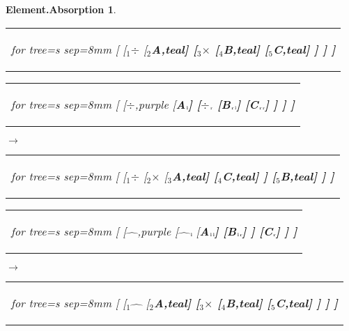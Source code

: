 \documentclass[UTF8,10pt]{ctexart}
\newcommand{\subtreeA}{\bf A}
\newcommand{\subtreeB}{\bf B}
\newcommand{\subtreeC}{\bf C}
\newcommand{\I}{$_{\scriptscriptstyle 1}$}
\newcommand{\II}{$_{\scriptscriptstyle 2}$}
\newcommand{\III}{$_{\scriptscriptstyle 3}$}
\newcommand{\IV}{$_{\scriptscriptstyle 4}$}
\newcommand{\V}{$_{\scriptscriptstyle 5}$}
\newcommand{\lc}{$_{\:\!\scriptscriptstyle\rm l\!}$}
\newcommand{\rc}{$_{\:\!\scriptscriptstyle\rm r\!}$}
\newcommand{\Multiplication}{$\times$}
\newcommand{\Division}{$\div$}
\newcommand{\Power}{$\hat{\quad}$}
\newtheorem*{Element.Absorption}{\bf Element.Absorption }
\begin{document}
\begin{center}
\begin{Element.Absorption}
\begin{tabular}{c}
				\begin{forest}
					for tree={s sep=8mm}
					[
						[\I\Division
							[\II\subtreeA,teal]
							[\III\Multiplication
								[\IV\subtreeB,teal]
								[\V\subtreeC,teal]
							]
						]
					]
				\end{forest}
			\end{tabular}
			\par\bigskip
			\begin{tabular}{c}
				\begin{forest}
					for tree={s sep=8mm}
					[
						[\Division,purple
							[\subtreeA\lc]
							[\Division\rc
								[\subtreeB\rc\lc]
								[\subtreeC\rc\rc]
							]
						]
					]
				\end{forest}
			\end{tabular}
			\qquad
			$\longrightarrow$
			\qquad
			\begin{tabular}{c}
				\begin{forest}
					for tree={s sep=8mm}
					[
						[\I\Division
							[\II\Multiplication
								[\III\subtreeA,teal]
								[\IV\subtreeC,teal]
							]
							[\V\subtreeB,teal]
						]
					]
				\end{forest}
			\end{tabular}
			\par\bigskip
			\begin{tabular}{c}
				\begin{forest}
					for tree={s sep=8mm}
					[
						[\Power,purple
							[\Power\lc
								[\subtreeA\lc\lc]
								[\subtreeB\lc\rc]
							]
							[\subtreeC\rc]
						]
					]
				\end{forest}
			\end{tabular}
			\qquad
			$\longrightarrow$
			\qquad
			\begin{tabular}{c}
				\begin{forest}
					for tree={s sep=8mm}
					[
						[\I\Power
							[\II\subtreeA,teal]
							[\III\Multiplication
								[\IV\subtreeB,teal]
								[\V\subtreeC,teal]
							]
						]
					]
				\end{forest}
			\end{tabular}
		\end{Element.Absorption}
	\vspace*{\fill}\end{center}

	\newpage
\end{document}
